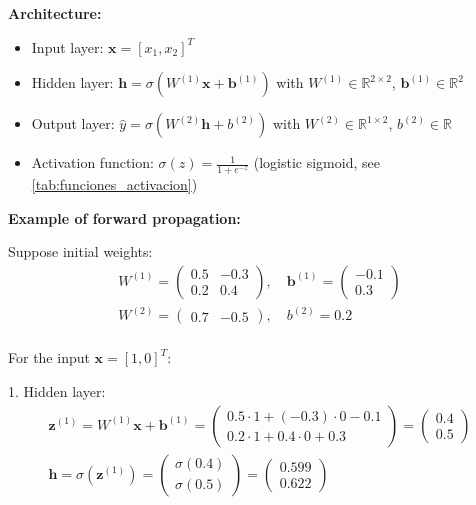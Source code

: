 \textbf{Architecture:}
\begin{itemize}
	\item Input layer: \(\mathbf{x} = [x_1, x_2]^T\)
	\item Hidden layer: \(\mathbf{h} = \sigma(W^{(1)}\mathbf{x} + \mathbf{b}^{(1)})\) with \(W^{(1)} \in \mathbb{R}^{2 \times 2}\), \(\mathbf{b}^{(1)} \in \mathbb{R}^2\)
	\item Output layer: \(\hat{y} = \sigma(W^{(2)}\mathbf{h} + b^{(2)})\) with \(W^{(2)} \in \mathbb{R}^{1 \times 2}\), \(b^{(2)} \in \mathbb{R}\)
	\item Activation function: \(\sigma(z) = \frac{1}{1 + e^{-z}}\) (logistic sigmoid, see \autoref{tab:funciones_activacion})
\end{itemize}

\textbf{Example of forward propagation:}

Suppose initial weights:
\begin{gather*}
    W^{(1)} = \begin{pmatrix}
		          0.5 & -0.3 \\
		          0.2 & 0.4
	\end{pmatrix}, \quad
	\mathbf{b}^{(1)} = \begin{pmatrix}
		                   -0.1 \\
		                   0.3
	\end{pmatrix}\\
    W^{(2)} = \begin{pmatrix}
		          0.7 & -0.5
	\end{pmatrix}, \quad
	b^{(2)} = 0.2\\
\end{gather*}

For the input \(\mathbf{x} = [1, 0]^T\):

1. Hidden layer:
\begin{gather*}
    \mathbf{z}^{(1)} = W^{(1)}\mathbf{x} + \mathbf{b}^{(1)} = \begin{pmatrix}
		                                                          0.5 \cdot 1 + (-0.3) \cdot 0 - 0.1 \\
		                                                          0.2 \cdot 1 + 0.4 \cdot 0 + 0.3
	\end{pmatrix} = \begin{pmatrix}
		                0.4 \\
		                0.5
	\end{pmatrix}\\
    \mathbf{h} = \sigma(\mathbf{z}^{(1)}) = \begin{pmatrix}
		                                        \sigma(0.4) \\
		                                        \sigma(0.5)
	\end{pmatrix} = \begin{pmatrix}
		                0.599 \\
		                0.622
	\end{pmatrix}\\
\end{gather*}

